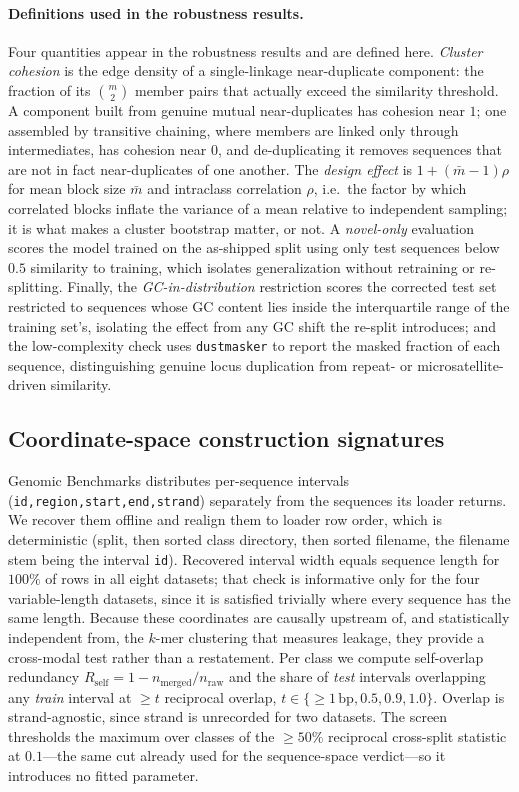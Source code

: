 \documentclass[webpdf,modern,large,namedate]{oup-authoring-template}%
\begin{document}
\paragraph{Definitions used in the robustness results.}\label{sec:m-diag}
Four quantities appear in the robustness results and are defined here. \emph{Cluster cohesion} is the edge density of a single-linkage near-duplicate component: the fraction of its $\binom{m}{2}$ member pairs that actually exceed the similarity threshold. A component built from genuine mutual near-duplicates has cohesion near $1$; one assembled by transitive chaining, where members are linked only through intermediates, has cohesion near $0$, and de-duplicating it removes sequences that are not in fact near-duplicates of one another. The \emph{design effect} is $1+(\bar m-1)\rho$ for mean block size $\bar m$ and intraclass correlation $\rho$, i.e.\ the factor by which correlated blocks inflate the variance of a mean relative to independent sampling; it is what makes a cluster bootstrap matter, or not. A \emph{novel-only} evaluation scores the model trained on the as-shipped split using only test sequences below $0.5$ similarity to training, which isolates generalization without retraining or re-splitting. Finally, the \emph{GC-in-distribution} restriction scores the corrected test set restricted to sequences whose GC content lies inside the interquartile range of the training set's, isolating the effect from any GC shift the re-split introduces; and the low-complexity check uses \texttt{dustmasker} \citep{morgulis2006dust} to report the masked fraction of each sequence, distinguishing genuine locus duplication from repeat- or microsatellite-driven similarity.

\subsection{Coordinate-space construction signatures}\label{sec:m-coord}
Genomic Benchmarks distributes per-sequence intervals (\texttt{id,region,start,end,strand}) separately from the sequences its loader returns. We recover them offline and realign them to loader row order, which is deterministic (split, then sorted class directory, then sorted filename, the filename stem being the interval \texttt{id}). Recovered interval width equals sequence length for $100\%$ of rows in all eight datasets; that check is informative only for the four variable-length datasets, since it is satisfied trivially where every sequence has the same length. Because these coordinates are causally upstream of, and statistically independent from, the $k$-mer clustering that measures leakage, they provide a cross-modal test rather than a restatement. Per class we compute self-overlap redundancy $R_{\mathrm{self}}=1-n_{\mathrm{merged}}/n_{\mathrm{raw}}$ and the share of \emph{test} intervals overlapping any \emph{train} interval at $\ge t$ reciprocal overlap, $t\in\{{\ge}1\,\mathrm{bp},0.5,0.9,1.0\}$. Overlap is strand-agnostic, since strand is unrecorded for two datasets. The screen thresholds the maximum over classes of the $\ge50\%$ reciprocal cross-split statistic at $0.1$---the same cut already used for the sequence-space verdict---so it introduces no fitted parameter.
\end{document}
